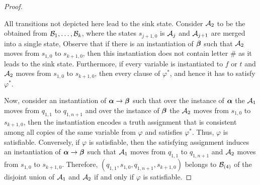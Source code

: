 \begin{proof}
\begin{figure}[h!]
\end{figure}
All transitions not depicted here lead to the sink state. 
Consider $\mathcal{A}_2$ to be the \DFA obtained from $\mathcal{B}_1, \ldots, \mathcal{B}_k$, where the states $s_{j+1,0}$ is $\mathcal{A}_{j}$ and $\mathcal{A}_{j+1}$ are merged into a single state,
Observe that if there is an instantiation of $\boldsymbol{\beta}$ such that $\mathcal{A}_2$ moves from $s_{1,0}$ to $s_{k+1,0}$, then this instantiation does not contain letter $\#$ as it leads to the sink state.
Furthermore, if every variable is instantiated to $f$ or $t$
and $\mathcal{A}_2$ moves from $s_{1,0}$ to $s_{k+1,0}$, then every clause of $\varphi^*$, and hence it has to satisfy $\varphi^*$.

Now, consider an instantiation of $\boldsymbol{\alpha} \to \boldsymbol{\beta}$ such that over the instance of $\boldsymbol{\alpha}$ the \DFA $\mathcal{A}_1$ moves from $q_{1,1}$ to $q_{1, n+1}$ and 
over the instance of $\boldsymbol{\beta}$ the \DFA $\mathcal{A}_2$ moves from $s_{1,0}$ to $s_{k+1,0}$, then the instantiation encodes a truth assignment that is consistent among all copies of
the same variable from $\varphi$ and satisfies $\varphi^*$. Thus, $\varphi$ is satisfiable.
Conversely, if $\varphi$ is satisfiable, then the satisfying assignment induces an instantiation of $\boldsymbol{\alpha} \to \boldsymbol{\beta}$ such that 
$\mathcal{A}_1$ moves from $q_{1,1}$ to $q_{1, n+1}$ and 
$\mathcal{A}_2$ moves from $s_{1,0}$ to $s_{k+1,0}$.
Therefore, $(q_{1,1}, s_{1,0},q_{1, n+1},s_{k+1,0})$ belongs to $\mathcal{B}_{(4)}$ of the disjoint union of $\mathcal{A}_1$ and $\mathcal{A}_2$ 
 if and only if $\varphi$ is satisfiable. 


\end{proof}
